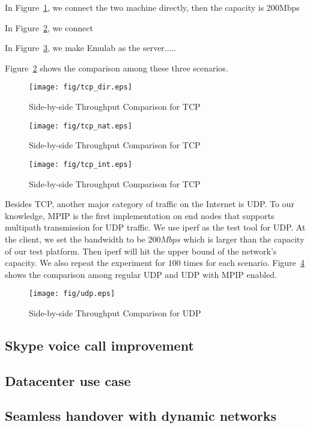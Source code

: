 In Figure~\ref{fig.tcp_dir}, we connect the two machine directly, then the capacity is 200Mbps

In Figure~\ref{fig.tcp_nat}, we connect 

In  Figure~\ref{fig.tcp_int}, we make Emulab as the server.....

Figure~\ref{fig.tcp_nat} shows the comparison among these three scenarios.

\begin{figure}
\centering
\texttt{[image: fig/tcp\_dir.eps]}
\caption{Side-by-side Throughput Comparison for TCP}
\label{fig.tcp_dir}
\end{figure}


\begin{figure}
\centering
\texttt{[image: fig/tcp\_nat.eps]}
\caption{Side-by-side Throughput Comparison for TCP}
\label{fig.tcp_nat}
\end{figure}

\begin{figure}
\centering
\texttt{[image: fig/tcp\_int.eps]}
\caption{Side-by-side Throughput Comparison for TCP}
\label{fig.tcp_int}
\end{figure}

Besides TCP, another major category of traffic on the Internet is UDP. To our knowledge, MPIP is the first implementation on end nodes that supports multipath transmission for UDP traffic. We use iperf as the test tool for UDP. At the client, we set the bandwidth to be $200Mbps$ which is larger than the capacity of our test platform. Then iperf will hit the upper bound of the network's capacity. We also repeat the experiment for $100$ times for each scenario. Figure~\ref{fig.udp} shows the comparison among regular UDP and UDP with MPIP enabled.

\begin{figure}
\centering
\texttt{[image: fig/udp.eps]}
\caption{Side-by-side Throughput Comparison for UDP}
\label{fig.udp}
\end{figure}


\subsection{Skype voice call improvement}
\label{sec:skype}

\subsection{Datacenter use case}
\label{sec:datacenter}

\subsection{Seamless handover with dynamic networks}
\label{sec:handover}
